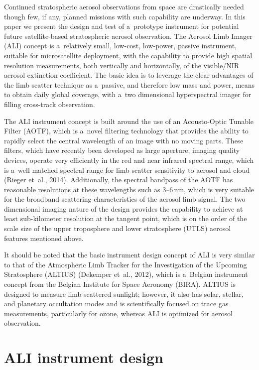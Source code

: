 \documentclass[amtd, online, hvmath]{copernicus}
\begin{document}
Continued stratospheric aerosol observations from space are
drastically needed though few, if any, planned missions with such
capability are underway. In this paper we present the design and test
of a~prototype instrument for potential future satellite-based
stratospheric aerosol observation. The Aerosol Limb Imager (ALI)
concept is a~relatively small, low-cost, low-power, passive
instrument, suitable for microsatellite deployment, with the
capability to provide high spatial resolution measurements, both
vertically and horizontally, of the visible/NIR aerosol extinction
coefficient. The basic idea is to leverage the clear advantages of the
limb scatter technique as a~passive, and therefore low mass and power,
means to obtain daily global coverage, with a~two dimensional
hyperspectral imager for filling cross-track observation.

The ALI instrument concept is built around the use of an Acousto-Optic
Tunable Filter (AOTF), which is a~novel filtering technology that
provides the ability to rapidly select the central wavelength of an
image with no moving parts. These filters, which have recently been
developed as large aperture, imaging quality devices, operate very
efficiently in the red and near infrared spectral range, which is
a~well matched spectral range for limb scatter sensitivity to aerosol
and cloud (Rieger et~al., 2014).  Additionally, the spectral bandpass
of the AOTF has reasonable resolutions at these
wavelengths such as 3--6\,\unit{nm}, which is very suitable for the broadband scattering
characteristics of the aerosol limb signal. The two dimensional
imaging nature of the design provides the capability to achieve at
least sub-kilometer resolution at the tangent point, which is on the
order of the scale size of the upper troposphere and lower
stratosphere (UTLS) aerosol features mentioned above.

It should be noted that the basic instrument design concept of ALI is
very similar to that of the Atmospheric Limb Tracker for the
Investigation of the Upcoming Stratosphere (ALTIUS) (Dekemper et~al.,
2012), which is a~Belgian instrument concept from the Belgian
Institute for Space Aeronomy (BIRA).  ALTIUS is designed to measure
limb scattered sunlight; however, it also has solar, stellar, and
planetary occultation modes and is scientifically focused on trace gas
measurements, particularly for ozone, whereas ALI is optimized for
aerosol observation.

\section{ALI instrument design}
\end{document}
